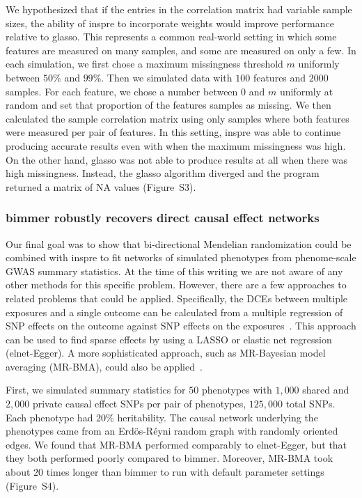\documentclass{article}
\begin{document}
We hypothesized that if the entries in the correlation matrix had variable
sample sizes, the ability of inspre to incorporate weights would improve
performance relative to glasso. This represents a common real-world setting in
which some features are measured on many samples, and some are measured
on only a few. In each simulation, we first chose a maximum missingness
threshold $m$ uniformly between $50\%$ and $99\%$. Then we simulated data with
$100$ features and $2000$ samples. For each feature, we chose
a number between $0$ and $m$ uniformly at random and set that proportion of the features
samples as missing. We then calculated the sample correlation matrix using only
samples where both features were measured per pair of features.
In this setting, inspre was able to continue producing accurate
results even with when the maximum missingness was high. On the other
hand, glasso was not able to produce results at all when there was high
missingness. Instead, the glasso algorithm diverged and the program returned
a matrix of NA values (Figure~S3).


\subsubsection*{bimmer robustly recovers direct causal effect networks}

Our final goal was to show that bi-directional Mendelian randomization
could be combined with inspre to fit networks of simulated phenotypes
from phenome-scale GWAS summary statistics. At the time of this writing
we are not aware of any other methods for this specific problem. However,
there are a few approaches to related problems that could be applied.
Specifically, the DCEs between multiple exposures and a single outcome
can be calculated from a multiple regression of SNP effects on the outcome
against SNP effects on the exposures~\cite{Burgess2015a}. This approach can be used
to find sparse effects by using a LASSO or elastic net regression (elnet-Egger). A more
sophisticated approach, such as MR-Bayesian model averaging (MR-BMA), could also be
applied~\cite{Zuber2020}.

First, we simulated summary
statistics for $50$ phenotypes with $1,000$ shared and $2,000$ private
causal effect SNPs per pair of phenotypes, $125,000$ total SNPs. Each
phenotype had $20\%$ heritability. The causal
network underlying the phenotypes came from an Erd\"os-R\'eyni random graph with
randomly oriented edges. We found that MR-BMA performed comparably to
elnet-Egger, but that they both performed poorly compared to bimmer.
Moreover, MR-BMA took about $20$ times longer than bimmer to run with
default parameter settings (Figure~S4).
\end{document}

